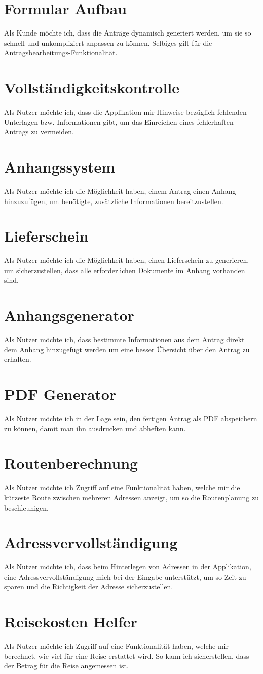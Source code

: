 \section{Formular Aufbau}
Als Kunde möchte ich, dass die Anträge dynamisch generiert werden, um sie so schnell und 
unkompliziert anpassen zu können. Selbiges gilt für die Antragsbearbeitungs-Funktionalität.
\section{Vollständigkeitskontrolle}
Als Nutzer möchte ich, dass die Applikation mir Hinweise bezüglich fehlenden Unterlagen bzw. 
Informationen gibt, um das Einreichen eines fehlerhaften Antrags zu vermeiden.
\section{Anhangssystem}
Als Nutzer möchte ich die Möglichkeit haben, einem Antrag einen Anhang hinzuzufügen, um benötigte, 
zusätzliche Informationen bereitzustellen.
\section{Lieferschein}
Als Nutzer möchte ich die Möglichkeit haben, einen Lieferschein zu generieren, um sicherzustellen, 
dass alle erforderlichen Dokumente im Anhang vorhanden sind.
\section{Anhangsgenerator}
Als Nutzer möchte ich, dass bestimmte Informationen aus dem Antrag direkt dem Anhang hinzugefügt 
werden um eine besser Übersicht über den Antrag zu erhalten.
\section{PDF Generator}
Als Nutzer möchte ich in der Lage sein, den fertigen Antrag als PDF abspeichern zu können, damit man 
ihn ausdrucken und abheften kann.
\section{Routenberechnung}
Als Nutzer möchte ich Zugriff auf eine Funktionalität haben, welche mir die kürzeste Route zwischen 
mehreren Adressen anzeigt, um so die Routenplanung zu beschleunigen.
\section{Adressvervollständigung}
Als Nutzer möchte ich, dass beim Hinterlegen von Adressen in der Applikation, eine 
Adressvervollständigung mich bei der Eingabe unterstützt, um so Zeit zu sparen und die Richtigkeit der 
Adresse sicherzustellen.
\section{Reisekosten Helfer}
Als Nutzer möchte ich Zugriff auf eine Funktionalität haben, welche mir berechnet, wie viel für eine 
Reise erstattet wird. So kann ich sicherstellen, dass der Betrag für die Reise angemessen ist.